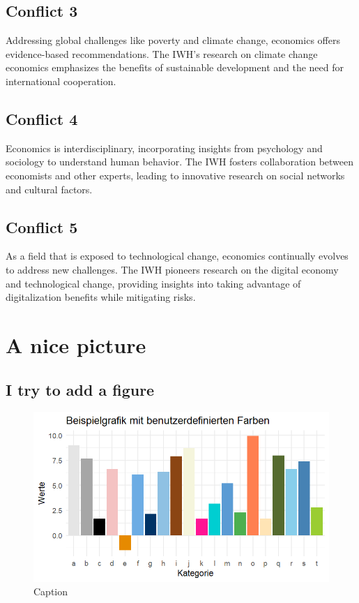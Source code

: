 \documentclass{article}
\begin{document}
\subsection{Conflict 3}
Addressing global challenges like poverty and climate change, economics offers evidence-based recommendations. The IWH's research on climate change economics emphasizes the benefits of sustainable development and the need for international cooperation.

\subsection{Conflict 4}
Economics is interdisciplinary, incorporating insights from psychology and sociology to understand human behavior. The IWH fosters collaboration between economists and other experts, leading to innovative research on social networks and cultural factors.

\subsection{Conflict 5}
As a field that is exposed to technological change, economics continually evolves to address new challenges. The IWH pioneers research on the digital economy and technological change, providing insights into taking advantage of digitalization benefits while mitigating risks.

\newpage
\section{A nice picture}
\subsection{I try to add a figure}
\begin{figure}[h]
  \centering
  \includegraphics[width=\textwidth]{Figures/efn/plot_example.png}
  \caption{Caption}
\end{figure}
\end{document}
